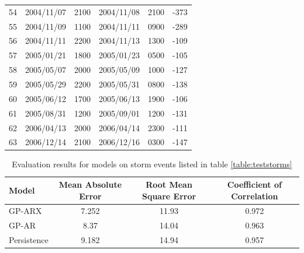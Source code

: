 \documentclass{article}
\begin{document}
\begin{table}[h]
\begin{tabular}{cccccc}
54 & 2004/11/07 & 2100 & 2004/11/08 & 2100 & -373 \\
55 & 2004/11/09 & 1100 & 2004/11/11 & 0900 & -289 \\
56 & 2004/11/11 & 2200 & 2004/11/13 & 1300 & -109 \\
57 & 2005/01/21 & 1800 & 2005/01/23 & 0500 & -105 \\
58 & 2005/05/07 & 2000 & 2005/05/09 & 1000 & -127 \\
59 & 2005/05/29 & 2200 & 2005/05/31 & 0800 & -138 \\
60 & 2005/06/12 & 1700 & 2005/06/13 & 1900 & -106 \\
61 & 2005/08/31 & 1200 & 2005/09/01 & 1200 & -131 \\
62 & 2006/04/13 & 2000 & 2006/04/14 & 2300 & -111 \\
63 & 2006/12/14 & 2100 & 2006/12/16 & 0300 & -147 \\ \hline
\end{tabular}%
\end{table}



\begin{table}[h]
\centering
\caption{Evaluation results for models on storm events listed in table \ref{table:teststorms}}
\label{table:results}
\begin{tabular}{l c c c}
\hline
Model & Mean Absolute Error & Root Mean Square Error & Coefficient of Correlation\\ \hline
GP-ARX & 7.252 & 11.93 & 0.972\\
GP-AR & 8.37 & 14.04 & 0.963\\
Persistence & 9.182 & 14.94 & 0.957\\
\end{tabular}
\end{table}


\clearpage 


\end{document}
